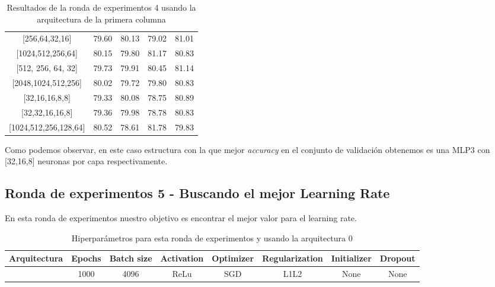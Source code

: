 \documentclass{article}
\begin{document}
\begin{center}
\begin{table}[h!]
\begin{tabular}{c|cccc}
{[}256,64,32,16{]}        & 79.60          & 80.13          & 79.02          & 81.01          \\
{[}1024,512,256,64{]}     & 80.15          & 79.80          & 81.17          & 80.83          \\
{[}512, 256, 64, 32{]}    & 79.73          & 79.91          & 80.45          & 81.14          \\
{[}2048,1024,512,256{]}   & 80.02          & 79.72          & 79.80          & 80.83          \\
{[}32,16,16,8,8{]}        & 79.33          & 80.08          & 78.75          & 80.89          \\
{[}32,32,16,16,8{]}       & 79.36          & 79.98          & 78.78          & 80.83          \\
{[}1024,512,256,128,64{]} & 80.52          & 78.61          & 81.78          & 79.83          \\ \hline
\end{tabular}

                \caption{Resultados de la ronda de experimentos 4 usando la arquitectura de la primera columna}
                \label{tab:res-j-a0-e4}
                \end{table}
                \end{center}
		    
		    Como podemos observar, en este caso estructura con la que mejor \textit{accuracy} en el conjunto de validaci\'on obtenemos es una MLP3 con [32,16,8] neuronas por capa respectivamente.
      \newpage
\subsection{Ronda de experimentos 5 - Buscando el mejor Learning Rate}  
En esta ronda de experimentos nuestro objetivo es encontrar el mejor valor para el learning rate. 

			\begin{table}[h!]
				\begin{center}
					\begin{tabular}{| c | c | c | c | c | c | c | c |}
						\textbf{Arquitectura} & \textbf{Epochs} & \textbf{Batch size} & \textbf{Activation} & \textbf{Optimizer} & \textbf{Regularization} & \textbf{Initializer} & \textbf{Dropout}\\ \hline
						[32,16,8] & 1000 & 4096 & ReLu & SGD & L1L2 & None & None
					\end{tabular}
					\caption{Hiperpar\'ametros para esta ronda de experimentos y usando la arquitectura 0}
					\label{tab:hip-j-a0-e5}
				\end{center}
			\end{table}
			
\end{document}
